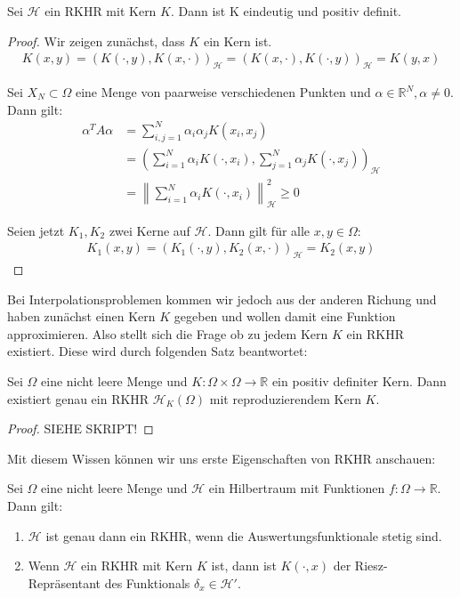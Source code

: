 \begin{theorem}
\label{thm:EindeutigkeitKern}
Sei $\mathcal{H}$ ein \ac{RKHR} mit Kern $K$. Dann ist K eindeutig und positiv definit.
\end{theorem}

\begin{proof}
Wir zeigen zunächst, dass $K$ ein Kern ist.
\begin{align*}
K(x,y) = \left( K(\cdot,y), K(x, \cdot)\right)_\mathcal{H} = \left(K(x,\cdot), K(\cdot,y)\right)_\mathcal{H} = K(y,x)
\end{align*}

Sei $X_N \subset \Omega$ eine Menge von paarweise verschiedenen Punkten und $\alpha \in \mathbb{R}^N, \alpha \neq 0$. Dann gilt:
\begin{align*}
\alpha^T A \alpha &= \sum_{i,j=1}^N \alpha_i \alpha_j K(x_i, x_j)\\
&= \left(\sum_{i=1}^N \alpha_i K(\cdot,x_i), \sum_{j=1}^N \alpha_j K(\cdot, x_j)\right)_\mathcal{H}\\
&= \left\| \sum_{i=1}^N \alpha_i K(\cdot,x_i)\right\|_\mathcal{H}^2 \geq 0
\end{align*}

Seien jetzt $K_1, K_2$ zwei Kerne auf $\mathcal{H}$. Dann gilt für alle $x,y \in \Omega$:
\begin{align*}
K_1(x,y) = (K_1(\cdot,y), K_2(x, \cdot))_\mathcal{H} = K_2(x,y)
\end{align*}
\end{proof}

Bei Interpolationsproblemen kommen wir jedoch aus der anderen Richung und haben zunächst einen Kern $K$ gegeben und wollen damit eine Funktion approximieren. Also stellt sich die Frage ob zu jedem Kern $K$ ein \ac{RKHR} existiert. Diese wird durch folgenden Satz beantwortet:

\begin{theorem}
Sei $\Omega$ eine nicht leere Menge und $K:\Omega \times \Omega \rightarrow \mathbb{R}$ ein positiv definiter Kern. Dann existiert genau ein \ac{RKHR} $\mathcal{H}_K (\Omega)$ mit reproduzierendem Kern $K$.
\end{theorem}
\begin{proof}
SIEHE SKRIPT!
\end{proof}

Mit diesem Wissen können wir uns erste Eigenschaften von \ac{RKHR} anschauen:

\begin{theorem}
\label{stetig}
Sei $\Omega$ eine nicht leere Menge und $\mathcal{H}$ ein Hilbertraum mit Funktionen $f: \Omega \rightarrow \mathbb{R}$. Dann gilt:
\begin{enumerate}
\item \label{stetig1} $\mathcal{H}$ ist genau dann ein \ac{RKHR}, wenn die Auswertungsfunktionale stetig sind.
\item \label{stetig2} Wenn $\mathcal{H}$ ein \ac{RKHR} mit Kern $K$ ist, dann ist $K(\cdot,x)$ der Riesz-Repräsentant des Funktionals $\delta_x \in \mathcal{H}'$.
\end{enumerate}
\end{theorem}

